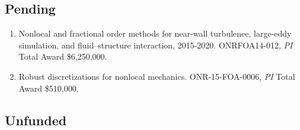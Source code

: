 \subsection*{Pending}

\begin{enumerate}
    \item Nonlocal and fractional order methods for near-wall turbulence, large-eddy simulation, and fluid--structure interaction, 2015-2020. ONRFOA14-012, \textit{PI} Total Award {\$}6,250,000.
    \item Robust discretizations for nonlocal mechanics. ONR-15-FOA-0006, \textit{PI} Total Award {\$}510,000.
\end{enumerate}

\subsection*{Unfunded}

